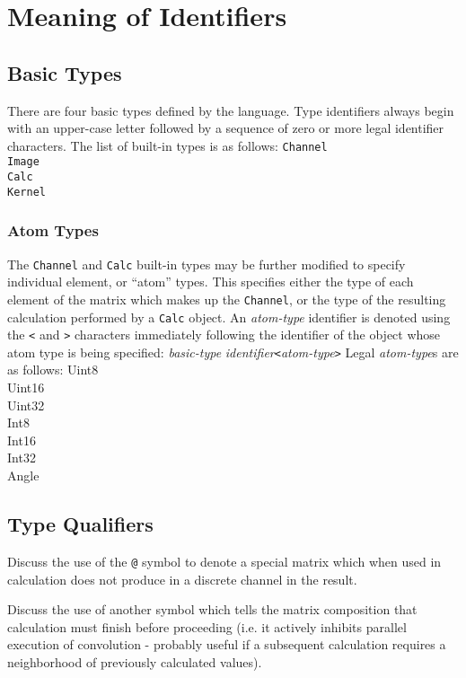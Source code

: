 \section{Meaning of Identifiers}
\label{sec:identmeaning}

\subsection{Basic Types}
\label{ssec:types}
There are four basic types defined by the \sys{} language.
Type identifiers always begin with an upper-case letter followed by a sequence
of zero or more legal identifier characters. The list of built-in types is as follows:
\startsyn
\texttt{Channel} \\
\texttt{Image} \\
\texttt{Calc} \\
\texttt{Kernel}
\stopsyn

\subsubsection{Atom Types}
\label{sssec:atomtypes}
The \texttt{Channel} and \texttt{Calc} built-in types may be further modified
to specify individual element, or ``atom'' types. This specifies either the type
of each element of the matrix which makes up the \texttt{Channel}, or the type
of the resulting calculation performed by a \texttt{Calc} object.
An \emph{atom-type} identifier is denoted using the \texttt{<} and \texttt{>}
characters immediately following the identifier of the object whose atom type
is being specified:
\startsyn
\emph{basic-type} \emph{identifier}\texttt{<}\emph{atom-type}\texttt{>}
\stopsyn
Legal \emph{atom-type}s are as follows:
\startsyn
Uint8 \\
Uint16 \\
Uint32 \\
Int8 \\
Int16 \\
Int32 \\
Angle
\stopsyn

\subsection{Type Qualifiers}
\label{ssec:typequal}
Discuss the use of the \texttt{@} symbol to denote a special matrix which when used
in calculation does not produce in a discrete channel in the result.

Discuss the use of another symbol which tells the matrix composition that calculation must finish before proceeding (i.e. it actively inhibits parallel execution of convolution - probably useful if a subsequent calculation requires a neighborhood of previously calculated values).

